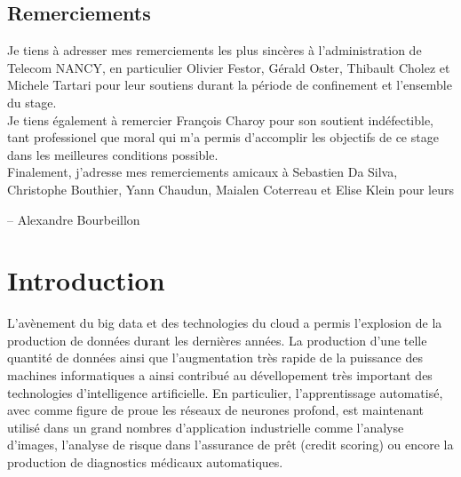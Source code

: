 \documentclass[stage3a]{tnreport} %
\begin{document}
\maketitle
{}


\cleardoublepage

\makesecondtitle

\section*{Remerciements}

{\em

Je tiens à adresser mes remerciements les plus sincères à l'administration de Telecom NANCY, en particulier Olivier Festor, Gérald Oster, Thibault Cholez et Michele Tartari pour leur soutiens durant la période de confinement et l'ensemble du stage. \\

Je tiens également à remercier François Charoy pour son soutient indéfectible, tant professionel que moral qui m'a permis d'accomplir les objectifs de ce stage dans les meilleures conditions possible.\\

Finalement, j'adresse mes remerciements amicaux à Sebastien Da Silva, Christophe Bouthier, Yann Chaudun, Maialen Coterreau et Elise Klein pour leurs
}

\hspace{4cm} -- Alexandre Bourbeillon


\cleardoublepage

\renewcommand{\baselinestretch}{0.5}\normalsize
\tableofcontents
\renewcommand{\baselinestretch}{1.0}\normalsize
\cleardoublepage

\setcounter{page}{1}

\chapter{Introduction}

L'avènement du big data et des technologies du cloud a permis l'explosion de la production de données durant les dernières années. La production d'une telle quantité de données ainsi que l'augmentation très rapide de la puissance des machines informatiques a ainsi contribué au dévellopement très important des technologies d'intelligence artificielle. En particulier, l'apprentissage automatisé, avec comme figure de proue les réseaux de neurones profond, est maintenant utilisé dans un grand nombres d'application industrielle comme l'analyse d'images, l'analyse de risque dans l'assurance de prêt (credit scoring) ou encore la production de diagnostics médicaux automatiques.
\end{document}
